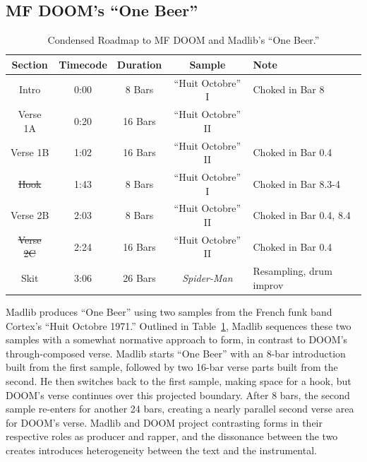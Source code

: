 \subsection*{\centering MF DOOM's ``One Beer''} 

    \begin{table}[ht]
        \centering
            \begin{tabular}{|c|c|c|c|l|}
                 \hline
                  Section         & Timecode & Duration & Sample              & Note                    \\ \hline
                  Intro           & 0:00     & 8 Bars   & ``Huit Octobre'' I  & Choked in Bar 8         \\ \hline
                  Verse 1A        & 0:20     & 16 Bars  & ``Huit Octobre'' II &                         \\ \hline
                  Verse 1B        & 1:02     & 16 Bars  & ``Huit Octobre'' II & Choked in Bar 0.4       \\ \hline
                  \sout{Hook}     & 1:43     & 8 Bars   & ``Huit Octobre'' I  & Choked in Bar 8.3-4     \\ \hline
                  Verse 2B        & 2:03     & 8 Bars   & ``Huit Octobre'' II & Choked in Bar 0.4, 8.4  \\ \hline
                  \sout{Verse 2C} & 2:24     & 16 Bars  & ``Huit Octobre'' II & Choked in Bar 0.4       \\ \hline
                  Skit            & 3:06     & 26 Bars  & \textit{Spider-Man} & Resampling, drum improv \\ \hline
             \end{tabular}
        \caption{Condensed Roadmap to MF DOOM and Madlib's ``One Beer.''}
        \label{tab:onebeer}
    \end{table}

Madlib produces ``One Beer'' using two samples from the French funk band Cortex's ``Huit Octobre 1971.'' Outlined in Table~\ref{tab:onebeer}, Madlib sequences these two samples with a somewhat normative approach to form, in contrast to DOOM's through-composed verse. Madlib starts ``One Beer'' with an 8-bar introduction built from the first sample, followed by two 16-bar verse parts built from the second. He then switches back to the first sample, making space for a hook, but DOOM's verse continues over this projected boundary. After 8 bars, the second sample re-enters for another 24 bars, creating a nearly parallel second verse area for DOOM's verse. Madlib and DOOM project contrasting forms in their respective roles as producer and rapper, and the dissonance between the two creates introduces heterogeneity between the text and the instrumental.

